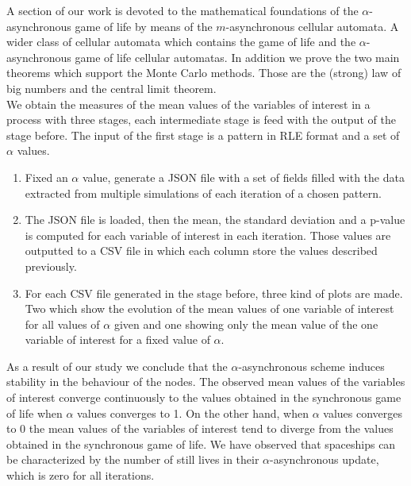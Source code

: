 \documentclass[../proyecto.tex]{book}
\begin{document}
A section of our work is devoted to the mathematical foundations of the $\alpha$-asynchronous game of life by means of the $m$-asynchronous cellular automata. A wider class of cellular automata which contains the game of life and the $\alpha$-asynchronous game of life cellular automatas. In addition we prove the two main theorems which support the Monte Carlo methods. Those are the (strong) law of big numbers and the central limit theorem. \\
 
We obtain the measures of the mean values of the variables of interest in a process with three stages, each intermediate stage is feed with the output of the stage before. The input of the first stage is a pattern in RLE format and a set of $\alpha$ values. \\
\begin{enumerate}
\item Fixed an $\alpha$ value, generate a JSON file with a set of fields filled with the data extracted from multiple simulations of each iteration of a chosen pattern.
\item The JSON file is loaded, then the mean, the standard deviation and a p-value is computed for each variable of interest in each iteration. Those values are outputted to a CSV file in which each column store the values described previously.
\item For each CSV file generated in the stage before, three kind of plots are made. Two which show the evolution of the mean values of one variable of interest for all values of $\alpha$ given and one showing only the mean value of the one variable of interest for a fixed value of $\alpha$.
\end{enumerate}

As a result of our study we conclude that the $\alpha$-asynchronous scheme induces stability in the behaviour of the nodes. The observed mean values of the variables of interest converge continuously to the values obtained in the synchronous game of life when $\alpha$ values converges to 1. On the other hand, when $\alpha$ values converges to 0 the mean values of the variables of interest tend to diverge from the values obtained in the synchronous game of life. We have observed that spaceships can be characterized by the number of still lives in their $\alpha$-asynchronous update, which is zero for all iterations. \\

\newpage
\end{document}

